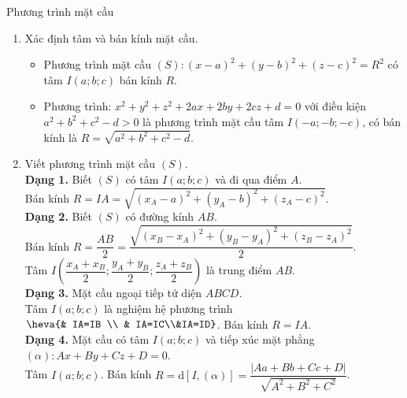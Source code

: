 \begin{dang}{Phương trình mặt cầu}
\begin{enumerate}
	\item Xác định tâm và bán kính mặt cầu.
	\begin{itemize}
		\item Phương trình mặt cầu $(S) \colon \boxed{(x-a)^2+(y-b)^2+(z-c)^2=R^2}$ có tâm $I\left(a;b;c\right)$ bán kính $R$.
		\item	Phương trình:
		$\boxed{x^2+y^2+z^2+2ax+2by+2cz+d=0}$ với điều kiện $a^2+b^2+c^2-d>0$ là phương trình mặt cầu tâm $I\left(-a;-b;-c\right)$, có bán kính là $R=\sqrt{a^2+b^2+c^2-d}$.
	\end{itemize}
	\item Viết phương trình mặt cầu $(S)$.\\
		\textbf{Dạng 1.} Biết $(S)$ có tâm $I(a;b;c)$ và đi qua điểm $A$.\\
		Bán kính $R=IA=\sqrt{(x_A-a)^2+(y_A-b)^2+(z_A-c)^2}$.
		\\\textbf{Dạng 2.} Biết $(S)$ có đường kính $AB$.\\
		 Bán kính $R=\dfrac{AB}{2}=\dfrac{\sqrt{(x_B-x_A)^2+(y_B-y_A)^2+(z_B-z_A)^2}}{2}$.\\ Tâm $I\left(\dfrac{x_A+x_B}{2};\dfrac{y_A+y_B}{2};\dfrac{z_A+z_B}{2}\right)$ là trung điểm $AB$.
		\\\textbf{Dạng 3.} Mặt cầu ngoại tiếp tứ diện  $ABCD$.\\
		 Tâm $I\left(a;b;c\right)$ là nghiệm hệ phương trình $\heva{& IA=IB \\ & IA=IC\\&IA=ID}$. Bán kính $R=IA$.
		\\\textbf{Dạng 4.} Mặt cầu có tâm $I(a;b;c)$ và tiếp xúc mặt phẳng $(\alpha):Ax+By+Cz+D=0$.\\
		 Tâm $I\left(a;b;c\right)$. Bán kính $R=\mathrm{d}[I,(\alpha)]=\dfrac{|Aa+Bb+Cc+D|}{\sqrt{A^2+B^2+C^2}}$.
		
\end{enumerate}
\end{dang}
\setcounter{subsubsection}{0}
\setcounter{vd}{0}
\setcounter{bt}{0}
\setcounter{ex}{0}
